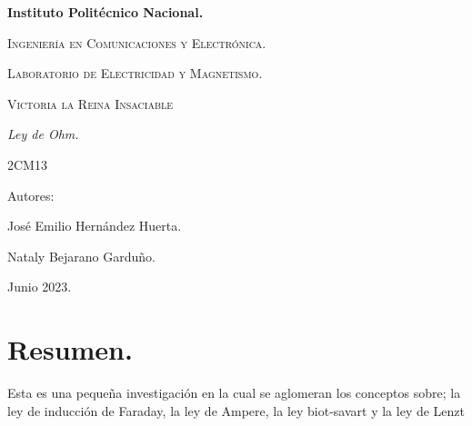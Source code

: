 \documentclass[10pt]{article}
\begin{document}
\pagestyle{fancy}
\cfoot{}


\lhead{}

\begin{titlepage}

	\begin{figure}[t]
		\hspace{0.6\textwidth}
	\end{figure}

	\centering
	{\bfseries\Huge Instituto Politécnico Nacional. \par}
	\vspace{1cm}
	{\scshape\Large Ingeniería en Comunicaciones y Electrónica. \par}
	\vspace{0.3cm}
	{\scshape\Large Laboratorio de Electricidad y Magnetismo.  \par}
	\vspace{1cm}
	{\scshape\Huge Victoria la Reina Insaciable \par}
	\vspace{1cm}
	{\itshape\Large Ley de Ohm. \par}
	{\Large 2CM13\par}
	\vfill
	{\Large Autores: \par}
	{\Large José Emilio Hernández Huerta. \par}
	{\Large Nataly Bejarano Garduño.\par}
	\vfill
	{\Large Junio 2023. \par}

\end{titlepage}

\newpage

\section{Resumen.}
Esta es una pequeña investigación en la cual se aglomeran los conceptos sobre; la ley de inducción de Faraday, la ley de Ampere, la ley biot-savart y la ley de Lenzt
\end{document}
